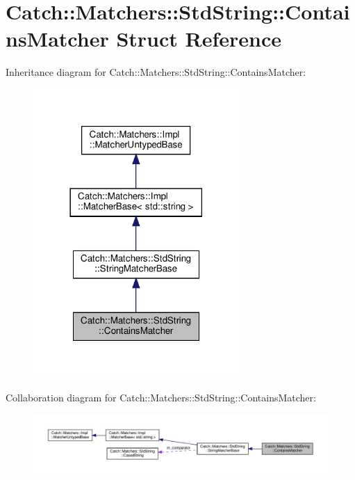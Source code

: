 \hypertarget{structCatch_1_1Matchers_1_1StdString_1_1ContainsMatcher}{}\section{Catch\+:\+:Matchers\+:\+:Std\+String\+:\+:Contains\+Matcher Struct Reference}
\label{structCatch_1_1Matchers_1_1StdString_1_1ContainsMatcher}


Inheritance diagram for Catch\+:\+:Matchers\+:\+:Std\+String\+:\+:Contains\+Matcher\+:\nopagebreak
\begin{figure}[H]
\begin{center}
\leavevmode
\includegraphics[width=222pt]{structCatch_1_1Matchers_1_1StdString_1_1ContainsMatcher__inherit__graph}
\end{center}
\end{figure}


Collaboration diagram for Catch\+:\+:Matchers\+:\+:Std\+String\+:\+:Contains\+Matcher\+:\nopagebreak
\begin{figure}[H]
\begin{center}
\leavevmode
\includegraphics[width=350pt]{structCatch_1_1Matchers_1_1StdString_1_1ContainsMatcher__coll__graph}
\end{center}
\end{figure}
